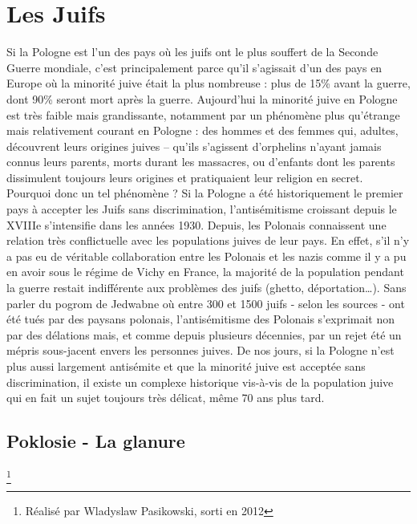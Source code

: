 \documentclass[12pt]{amsart}
\begin{document}
\section{Les Juifs}
Si la Pologne est l’un des pays où les juifs ont le plus souffert de la Seconde Guerre mondiale, c’est principalement parce qu’il s’agissait d’un des pays en Europe où la minorité juive était la plus nombreuse : plus de 15\% avant la guerre, dont 90\%  seront mort après la guerre. Aujourd’hui la minorité juive en Pologne est très faible mais grandissante, notamment par un phénomène plus qu’étrange mais relativement courant en Pologne : des hommes et des femmes qui, adultes, découvrent leurs origines juives – qu’ils s’agissent d’orphelins n’ayant jamais connus leurs parents, morts durant les massacres, ou d’enfants dont les parents dissimulent toujours leurs origines et pratiquaient leur religion en secret. Pourquoi donc un tel phénomène ? Si la Pologne a été historiquement le premier pays à accepter les Juifs sans discrimination, l’antisémitisme croissant depuis le XVIIIe s'intensifie dans les années 1930. Depuis, les Polonais connaissent une relation très conflictuelle avec les populations juives de leur pays. En effet, s’il n’y a pas eu de véritable collaboration entre les Polonais et les nazis comme il y a pu en avoir sous le régime de Vichy en France, la majorité de la population pendant la guerre restait indifférente aux problèmes des juifs (ghetto, déportation…). Sans parler du pogrom de Jedwabne où entre 300 et 1500 juifs - selon les sources - ont été tués par des paysans polonais, l’antisémitisme des Polonais s’exprimait non par des délations mais, et comme depuis plusieurs décennies, par un rejet été un mépris sous-jacent envers les personnes juives. De nos jours, si la Pologne n’est plus aussi largement antisémite et que la minorité juive est acceptée sans discrimination, il existe un complexe historique vis-à-vis de la population juive qui en fait un sujet toujours très délicat, même 70 ans plus tard.
\subsection*{Poklosie - La glanure}\footnote{Réalisé par Wladyslaw Pasikowski, sorti en 2012}
\end{document}
